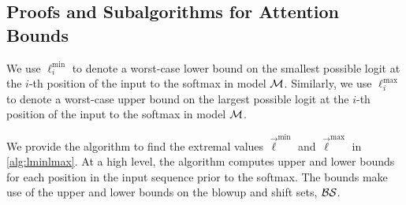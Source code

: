 \subsection{Proofs and Subalgorithms for Attention Bounds}
\begin{definition} \label{def:lminlmax}
	We use $\ell^{\min}_i$ to denote 
	a worst-case lower bound on the smallest possible logit at the $i$-th position of the input to the softmax in model $\mathcal{M}$. 
	Similarly, we use $\ell^{\max}_i$ to denote a worst-case upper bound on the largest possible logit at the $i$-th position of the input to the softmax in model $\mathcal{M}$.
\end{definition}

We provide the algorithm to find the extremal values $\vec{\ell}^{\min}$ and $\vec{\ell}^{\max}$ in \cref{alg:lminlmax}.
At a high level, the algorithm computes upper and lower bounds for each position in the input sequence prior to the softmax.
The bounds make use of the upper and lower bounds on the blowup and shift sets, $\mathcal{B} \mathcal{S}$.


